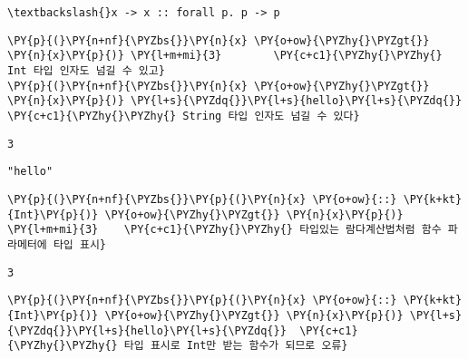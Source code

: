     
    \begin{Verbatim}[commandchars=\\\{\}]
\textbackslash{}x -> x :: forall p. p -> p
    \end{Verbatim}

    
    \begin{tcolorbox}[breakable, size=fbox, boxrule=1pt, pad at break*=1mm,colback=cellbackground, colframe=cellborder, top=.75ex]
\begin{Verbatim}[commandchars=\\\{\}]
\PY{p}{(}\PY{n+nf}{\PYZbs{}}\PY{n}{x} \PY{o+ow}{\PYZhy{}\PYZgt{}} \PY{n}{x}\PY{p}{)} \PY{l+m+mi}{3}        \PY{c+c1}{\PYZhy{}\PYZhy{} Int 타입 인자도 넘길 수 있고}
\PY{p}{(}\PY{n+nf}{\PYZbs{}}\PY{n}{x} \PY{o+ow}{\PYZhy{}\PYZgt{}} \PY{n}{x}\PY{p}{)} \PY{l+s}{\PYZdq{}}\PY{l+s}{hello}\PY{l+s}{\PYZdq{}}  \PY{c+c1}{\PYZhy{}\PYZhy{} String 타입 인자도 넘길 수 있다}
\end{Verbatim}
\end{tcolorbox}

    
    \begin{Verbatim}[commandchars=\\\{\}]
3
    \end{Verbatim}

    
    
    \begin{Verbatim}[commandchars=\\\{\}]
"hello"
    \end{Verbatim}

    
    \begin{tcolorbox}[breakable, size=fbox, boxrule=1pt, pad at break*=1mm,colback=cellbackground, colframe=cellborder, top=.75ex]
\begin{Verbatim}[commandchars=\\\{\}]
\PY{p}{(}\PY{n+nf}{\PYZbs{}}\PY{p}{(}\PY{n}{x} \PY{o+ow}{::} \PY{k+kt}{Int}\PY{p}{)} \PY{o+ow}{\PYZhy{}\PYZgt{}} \PY{n}{x}\PY{p}{)} \PY{l+m+mi}{3}    \PY{c+c1}{\PYZhy{}\PYZhy{} 타입있는 람다계산법처럼 함수 파라메터에 타입 표시}
\end{Verbatim}
\end{tcolorbox}

    
    \begin{Verbatim}[commandchars=\\\{\}]
3
    \end{Verbatim}

    
    \begin{tcolorbox}[breakable, size=fbox, boxrule=1pt, pad at break*=1mm,colback=cellbackground, colframe=cellborder, top=.75ex]
\begin{Verbatim}[commandchars=\\\{\}]
\PY{p}{(}\PY{n+nf}{\PYZbs{}}\PY{p}{(}\PY{n}{x} \PY{o+ow}{::} \PY{k+kt}{Int}\PY{p}{)} \PY{o+ow}{\PYZhy{}\PYZgt{}} \PY{n}{x}\PY{p}{)} \PY{l+s}{\PYZdq{}}\PY{l+s}{hello}\PY{l+s}{\PYZdq{}}  \PY{c+c1}{\PYZhy{}\PYZhy{} 타입 표시로 Int만 받는 함수가 되므로 오류}
\end{Verbatim}
\end{tcolorbox}

